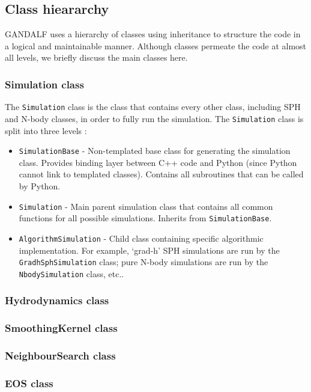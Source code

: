 \documentclass[a4paper]{article}
\newcommand{\var}[1]{\texttt{#1}}
\begin{document}
\subsection{Class hieararchy}
GANDALF uses a hierarchy of classes using inheritance to structure the code in a logical and maintainable manner.  Although classes permeate the code at almost all levels, we briefly discuss the main classes here.

\subsubsection{Simulation class}
The \var{Simulation} class is the class that contains every other class, including SPH and N-body classes, in order to fully run the simulation.  The \var{Simulation} class is split into three levels :
\begin{itemize}
\item \var{SimulationBase} - Non-templated base class for generating the simulation class.  Provides binding layer between C++ code and Python (since Python cannot link to templated classes).  Contains all subroutines that can be called by Python.
\item \var{Simulation} - Main parent simulation class that contains all common functions for all possible simulations.  Inherits from \var{SimulationBase}.
\item \var{AlgorithmSimulation} - Child class containing specific algorithmic implementation.  For example, `grad-h' SPH simulations are run by the \var{GradhSphSimulation} class; pure N-body simulations are run by the \var{NbodySimulation} class, etc..
\end{itemize}

\subsubsection{Hydrodynamics class}

\subsubsection{SmoothingKernel class}

\subsubsection{NeighbourSearch class}

\subsubsection{EOS class}
\end{document}
